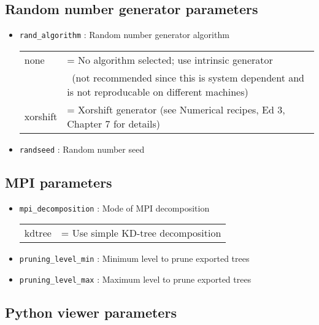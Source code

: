 \documentclass[a4paper]{article}
\newcommand{\var}[1]{\texttt{#1}}
\begin{document}
\subsection{Random number generator parameters}

\begin{itemize}

\item \var{rand\_algorithm} : Random number generator algorithm \\
\begin{tabular}{ll}
none     & = No algorithm selected; use intrinsic generator \\
         & \,\,\,(not recommended since this is system dependent and is not reproducable on different machines) \\
xorshift & = Xorshift generator (see Numerical recipes, Ed 3, Chapter 7 for details)
\end{tabular}

\item \var{randseed}        : Random number seed

\end{itemize}





\subsection{MPI parameters}

\begin{itemize}

\item \var{mpi\_decomposition}  : Mode of MPI decomposition \\
\begin{tabular}{ll}
kdtree & = Use simple KD-tree decomposition
\end{tabular}
\item \var{pruning\_level\_min} : Minimum level to prune exported trees
\item \var{pruning\_level\_max} : Maximum level to prune exported trees

\end{itemize}



\subsection{Python viewer parameters}
\end{document}
